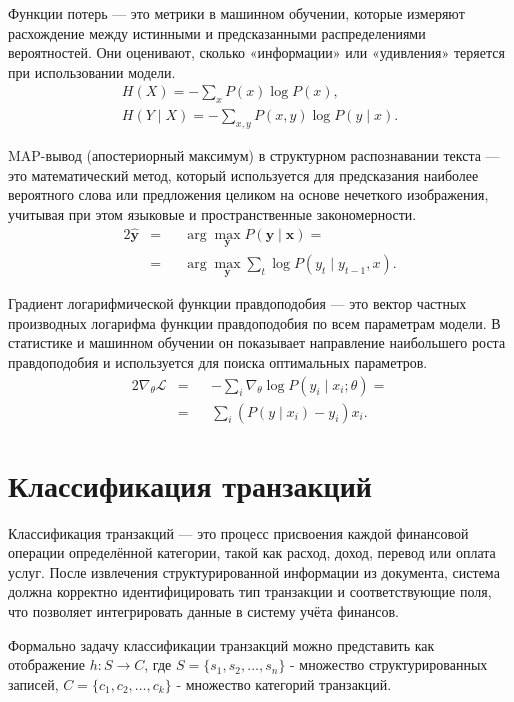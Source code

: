 \documentclass[14pt,a4paper]{extarticle}
\let\oldsection\section
\renewcommand{\section}{\clearpage\oldsection}
\begin{document}
Функции потерь — это метрики в машинном обучении, которые измеряют расхождение между истинными и предсказанными распределениями вероятностей. Они оценивают, сколько «информации» или «удивления» теряется при использовании модели.
\begin{gather*}
H(X) = -\sum_x P(x)\log P(x), \\
H(Y \mid X) = -\sum_{x,y} P(x,y)\log P(y \mid x).
\end{gather*}

MAP-вывод (апостериорный максимум) в структурном распознавании текста — это математический метод, который используется для предсказания наиболее вероятного слова или предложения целиком на основе нечеткого изображения, учитывая при этом языковые и пространственные закономерности.
\begin{alignat*}{2}
\hat{\mathbf{y}} &= && \arg\max_{\mathbf{y}} P(\mathbf{y} \mid \mathbf{x}) = \\
&= && \arg\max_{\mathbf{y}} \sum_t \log P(y_t \mid y_{t-1}, x).
\end{alignat*}

Градиент логарифмической функции правдоподобия — это вектор частных производных логарифма функции правдоподобия по всем параметрам модели. В статистике и машинном обучении он показывает направление наибольшего роста правдоподобия и используется для поиска оптимальных параметров.
\begin{alignat*}{2}
\nabla_{\theta} \mathcal{L}
&= && - \sum_i \nabla_{\theta} \log P(y_i \mid x_i; \theta) = \\
&= && \sum_i (P(y \mid x_i) - y_i)x_i.
\end{alignat*}

\section{Классификация транзакций}

Классификация транзакций — это процесс присвоения каждой финансовой операции определённой категории, такой как расход, доход, перевод или оплата услуг. После извлечения структурированной информации из документа, система должна корректно идентифицировать тип транзакции и соответствующие поля, что позволяет интегрировать данные в систему учёта финансов.

Формально задачу классификации транзакций можно представить как отображение $h : S \rightarrow C$, где $S=\{s_1,s_2,\dots,s_n\}$ - множество структурированных записей, $C=\{c_1,c_2,\dots,c_k\}$ - множество категорий транзакций.
\end{document}
